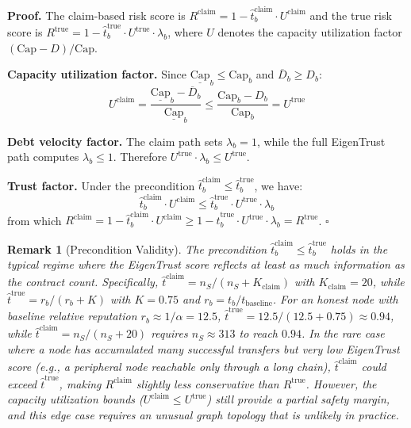 \documentclass[11pt]{article}
\newtheorem{remark}[theorem]{Remark}
\newcommand{\qed}{\hfill}
\newenvironment{proof}{\noindent\textbf{Proof.}}{\qed$\square$\par\medskip}
\begin{document}
\begin{proof}
The claim-based risk score is $R^{\text{claim}} = 1 - \hat{t}^{\text{claim}}_b \cdot U^{\text{claim}}$ and the true risk score is $R^{\text{true}} = 1 - \hat{t}^{\text{true}}_b \cdot U^{\text{true}} \cdot \lambda_b$, where $U$ denotes the capacity utilization factor $(\text{Cap} - D) / \text{Cap}$.

\textbf{Capacity utilization factor.} Since $\underline{\text{Cap}}_b \leq \text{Cap}_b$ and $\overline{D}_b \geq D_b$:
\[
    U^{\text{claim}} = \frac{\underline{\text{Cap}}_b - \overline{D}_b}{\underline{\text{Cap}}_b} \leq \frac{\text{Cap}_b - D_b}{\text{Cap}_b} = U^{\text{true}}
\]

\textbf{Debt velocity factor.} The claim path sets $\lambda_b = 1$, while the full EigenTrust path computes $\lambda_b \leq 1$. Therefore $U^{\text{true}} \cdot \lambda_b \leq U^{\text{true}}$.

\textbf{Trust factor.} Under the precondition $\hat{t}^{\text{claim}}_b \leq \hat{t}^{\text{true}}_b$, we have:
\[
    \hat{t}^{\text{claim}}_b \cdot U^{\text{claim}} \leq \hat{t}^{\text{true}}_b \cdot U^{\text{true}} \cdot \lambda_b
\]
from which $R^{\text{claim}} = 1 - \hat{t}^{\text{claim}}_b \cdot U^{\text{claim}} \geq 1 - \hat{t}^{\text{true}}_b \cdot U^{\text{true}} \cdot \lambda_b = R^{\text{true}}$. \qed
\end{proof}

\begin{remark}[Precondition Validity]
The precondition $\hat{t}^{\text{claim}}_b \leq \hat{t}^{\text{true}}_b$ holds in the typical regime where the EigenTrust score reflects at least as much information as the contract count. Specifically, $\hat{t}^{\text{claim}} = n_S / (n_S + K_{\text{claim}})$ with $K_{\text{claim}} = 20$, while $\hat{t}^{\text{true}} = r_b / (r_b + K)$ with $K = 0.75$ and $r_b = t_b / t_{\text{baseline}}$. For an honest node with baseline relative reputation $r_b \approx 1/\alpha = 12.5$, $\hat{t}^{\text{true}} = 12.5/(12.5 + 0.75) \approx 0.94$, while $\hat{t}^{\text{claim}} = n_S/(n_S + 20)$ requires $n_S \approx 313$ to reach $0.94$. In the rare case where a node has accumulated many successful transfers but very low EigenTrust score (e.g., a peripheral node reachable only through a long chain), $\hat{t}^{\text{claim}}$ could exceed $\hat{t}^{\text{true}}$, making $R^{\text{claim}}$ slightly less conservative than $R^{\text{true}}$. However, the capacity utilization bounds ($U^{\text{claim}} \leq U^{\text{true}}$) still provide a partial safety margin, and this edge case requires an unusual graph topology that is unlikely in practice.
\end{remark}
\end{document}
